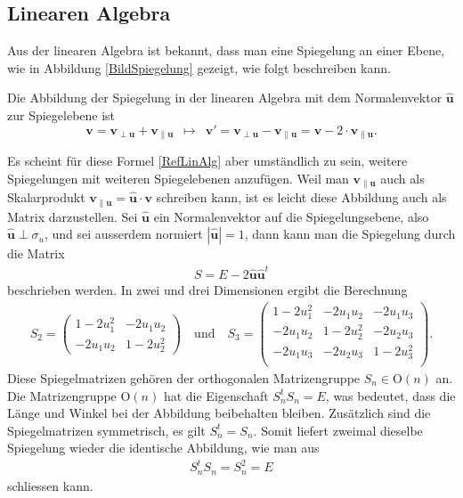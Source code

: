 \subsection{Linearen Algebra}
Aus der linearen Algebra ist bekannt, dass man eine Spiegelung an einer Ebene, wie in Abbildung \ref{BildSpiegelung} gezeigt, wie folgt beschreiben kann.
\begin{definition}
	Die Abbildung der Spiegelung in der linearen Algebra mit dem Normalenvektor $\mathbf{\hat{u}}$ zur Spiegelebene ist
	\begin{equation} \label{RefLinAlg}
	\mathbf{v} = \mathbf{v_{\perp u}} + \mathbf{v_{\parallel u}} \enspace\mapsto\enspace \mathbf{v'} =  \mathbf{v_{\perp u}} - \mathbf{v_{\parallel u}} = \mathbf{v} - 2 \cdot \mathbf{v_{\parallel u}}.
	\end{equation}
\end{definition}
Es scheint für diese Formel \eqref{RefLinAlg} aber umständlich zu sein, weitere Spiegelungen mit weiteren Spiegelebenen anzufügen. Weil man $\mathbf{v_{\parallel u}}$ auch als Skalarprodukt $\mathbf{v_{\parallel u}} = \mathbf{\hat{u}} \cdot \mathbf{v}$ schreiben kann, ist es leicht diese Abbildung auch als Matrix darzustellen. Sei $\mathbf{\hat{u}}$ ein Normalenvektor auf die Spiegelungsebene, also $\mathbf{\hat{u}}\perp \sigma_u$, und sei ausserdem normiert $|\mathbf{\hat{u}}| = 1$, dann kann man die Spiegelung durch die Matrix
\begin{align}
S = E - 2\mathbf{\hat{u}\hat{u}}^t
\end{align}
beschrieben werden. In zwei und drei Dimensionen ergibt die Berechnung
\begin{align} \label{Spiegelmatrizen}
S_2 = \begin{pmatrix}
1-2u_1^2 & -2u_1u_2 \\
-2u_1u_2 & 1-2u_2^2
\end{pmatrix}\quad\text{und}\quad
S_3 = \begin{pmatrix}
1-2u_1^2 & -2u_1u_2 & -2u_1u_3\\
-2u_1u_2 & 1-2u_2^2 & -2u_2u_3\\
-2u_1u_3 & -2u_2u_3 & 1-2u_3^2\\
\end{pmatrix}.
\end{align}
Diese Spiegelmatrizen gehören der orthogonalen Matrizengruppe $S_n\in \text{O}(n)$ an. Die Matrizengruppe $\text{O}(n)$ hat die Eigenschaft $S_n^t S_n = E$, was bedeutet, dass die Länge und Winkel bei der Abbildung beibehalten bleiben. Zusätzlich sind die Spiegelmatrizen symmetrisch, es gilt $S_n^t = S_n$. Somit liefert zweimal dieselbe Spiegelung wieder die identische Abbildung, wie man aus
\begin{align}
S_n^t S_n = S_n^2 = E
\end{align}
schliessen kann.


